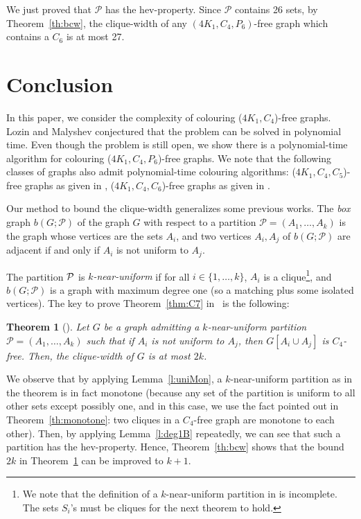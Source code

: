 \documentclass[12pt]{article}
\newtheorem{Theorem}{Theorem}[section]
\begin{document}
We just proved that $\mathcal P$ has the hev-property. Since $\mathcal P$ contains 26 sets, by Theorem~\ref{th:bcw}, the clique-width of any $(4K_1, C_4, P_6)$-free graph which contains a $C_6$ is at most 27. 



\section{Conclusion}\label{sec:conclusions}

In this paper, we consider the complexity of colouring ($4K_1,C_4$)-free graphs.   
Lozin and  Malyshev \cite{Lozin} conjectured that the problem can be solved in polynomial time.  
Even though the problem is still open, we show there is a polynomial-time algorithm for	colouring ($4K_1,C_4,P_6$)-free graphs. 
We note that the following classes of graphs also admit polynomial-time colouring algorithms: ($4K_1,C_4,C_5$)-free graphs as given in \cite{FraHam2018}, ($4K_1,C_4,C_6$)-free graphs as given in \cite{Pen2020}. 

Our method to bound the clique-width generalizes some previous works. 
The {\it box} graph $b(G;\mathcal{P})$ of the graph $G$ with respect to a partition $\mathcal P = (A_1, \dots, A_k)$ is the graph whose vertices are the sets $A_i$, and two vertices $A_i, A_j$ of $b(G;\mathcal{P})$ are adjacent if
and only if $A_i$ is not uniform to  $A_j$. 

The partition ${\cal P}$ is \emph{$k$-near-uniform} if for all $i\in \{1, \dots, k\}$, $A_i$ is a clique\footnote{We note that the definition of a $k$-near-uniform partition in \cite{FraHam2017} is incomplete. The sets $S_i$'s must be cliques for the next theorem to hold.}, and $b(G;\mathcal{P})$ is a graph with maximum degree one (so a matching plus some isolated vertices). The key to prove Theorem~\ref{thm:C7} in~\cite{FraHam2017} is the following: 

\begin{Theorem}[\cite{FraHam2017}]
	\label{thm:near-uniform}
	Let $G$ be a graph admitting a $k$-near-uniform  partition $\mathcal P = (A_1, \dots, A_k)$ such that if $A_i$ is not uniform to $A_j$, then $G[A_i \cup A_j]$ is $C_4$-free. Then, the clique-width of $G$ is at most $2k$. 
\end{Theorem}

We observe that by applying  Lemma~\ref{l:uniMon}, a $k$-near-uniform partition as in the theorem is in fact monotone (because any set of the partition is uniform to all other sets except possibly one, and in this case, we use the fact pointed out in Theorem~\ref{th:monotone}: two cliques in a $C_4$-free graph are monotone to each other). Then, by applying Lemma~\ref{l:deg1B} repeatedly, we can see that such a partition has the hev-property. Hence, Theorem~\ref{th:bcw} shows that the bound $2k$ in Theorem~\ref{thm:near-uniform} can be improved to $k+1$. 
\end{document}
